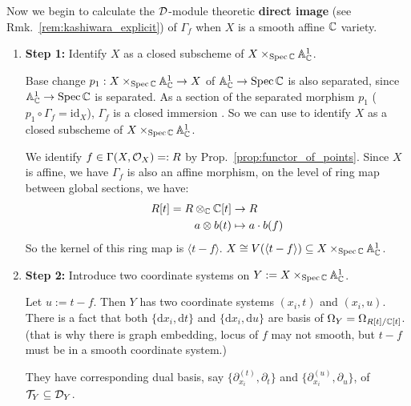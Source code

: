 \begin{example}\label{example:direct_image_of_graph_embedding}
    Now we begin to calculate the $\mathcal{D}$-module theoretic \textbf{direct image} (see Rmk.~\ref{rem:kashiwara_explicit}) of $\Gamma_f$ when $X$ is a smooth affine $\mathbb{C}$ variety.

    \begin{enumerate}
        \item \textbf{Step 1:} Identify $X$ as a closed subscheme of $X\times_{\operatorname{Spec}\mathbb{C}}\mathbb{A}^1_{\mathbb{C}}$.

              Base change $p_1:X\times_{\operatorname{Spec}\mathbb{C}}\mathbb{A}^1_{\mathbb{C}} \to X$ of $\mathbb{A}^1_{\mathbb{C}} \to \operatorname{Spec}\mathbb{C}$ is also separated, since $\mathbb{A}^1_{\mathbb{C}} \to \operatorname{Spec}\mathbb{C}$ is separated.
              As a section of the separated morphism $p_1$ ($p_1\circ\Gamma_f = \mathrm{id}_X$), $\Gamma_f$ is a closed immersion \cite[\href{https://stacks.math.columbia.edu/tag/024T}{Tag 024T}]{stacks-project}.
              So we can use \cite[\href{https://stacks.math.columbia.edu/tag/01HO}{Tag 01HO}]{stacks-project} to identify $X$ as a closed subscheme of $X\times_{\operatorname{Spec}\mathbb{C}}\mathbb{A}^1_{\mathbb{C}}$.

              We identify $f\in \Gamma(X,\mathcal{O}_X) =: R$ by Prop.~\ref{prop:functor_of_points}.
              Since $X$ is affine, we have $\Gamma_f$ is also an affine morphism, on the level of ring map between global sections, we have:
              \begin{align*}
                  R[t] = R \otimes_{\mathbb{C}} \mathbb{C}[t] & \to R               \\
                  a \otimes b(t)            & \mapsto a\cdot b(f)
              \end{align*}
              So the kernel of this ring map is $\langle t - f \rangle$. $X\cong V(\langle t - f \rangle) \subseteq X\times_{\operatorname{Spec}\mathbb{C}}\mathbb{A}^1_{\mathbb{C}}$.

        \item \textbf{Step 2:} Introduce two coordinate systems on $Y:=X\times_{\operatorname{Spec}\mathbb{C}}\mathbb{A}^1_{\mathbb{C}}$.

              Let $u:=t-f$. Then $Y$ has two coordinate systems $(x_i,t)$ and $(x_i,u)$.
              There is a fact that both $\{\mathrm{d} x_i,\mathrm{d} t\}$ and $\{\mathrm{d} x_i,\mathrm{d} u\}$ are basis of $\Omega_Y = \Omega_{R[t]/\mathbb{C}[t]}$.
              (that is why there is graph embedding, locus of $f$ may not smooth, but $t-f$ must be in a smooth coordinate system.)

              They have corresponding dual basis, say $\{\partial^{(t)}_{x_i},\partial_t\}$ and $\{\partial^{(u)}_{x_i},\partial_u\}$, of $\mathcal{T}_Y\subseteq \mathcal{D}_Y$.


\end{enumerate}
\end{example}
